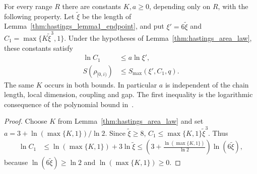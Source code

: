 \begin{lemma}
    \label{thm:hastings_area_law_log_constant}
    \leanok
    For every range $R$ there are constants $K,a\ge0$, depending only on $R$,
    with the following property. Let $\tilde\xi$ be the length of
    Lemma~\ref{thm:hastings_lemma1_endpoint}, and put $\xi'=6\tilde\xi$ and
    $C_1=\max\{K\tilde\xi^3,1\}$. Under the hypotheses of
    Lemma~\ref{thm:hastings_area_law}, these constants satisfy
    \begin{align}
        \ln C_1               & \le a\ln\xi',             \\
        S(\rho_{\lbrack0,i)}) & \le S_{\max}(\xi',C_1,q).
        \label{eq:hastings_area_log_constant}
    \end{align}
    The same $K$ occurs in both bounds. In particular $a$ is independent
    of the chain length, local dimension, coupling and gap. The first
    inequality is the logarithmic consequence of the polynomial bound
    in~\cite[lines 258--262]{Hastings2007AreaLaw}.
\end{lemma}
\begin{proof}\leanok
    Choose $K$ from Lemma~\ref{thm:hastings_area_law} and set
    $a=3+\ln(\max\{K,1\})/\ln2$. Since $\tilde\xi\ge8$,
    $C_1\le\max\{K,1\}\tilde\xi^3$. Thus
    \begin{align}
        \ln C_1
         & \le\ln(\max\{K,1\})+3\ln\tilde\xi
        \le\left(3+\frac{\ln(\max\{K,1\})}{\ln2}\right)\ln(6\tilde\xi),
        \label{eq:hastings_area_log_estimate}
    \end{align}
    because $\ln(6\tilde\xi)\ge\ln2$ and $\ln(\max\{K,1\})\ge0$.
\end{proof}
